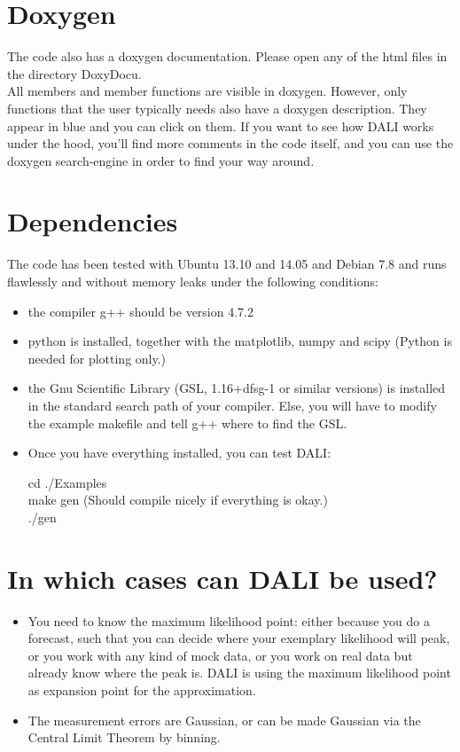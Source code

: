 \documentclass[12pt,twoside]{extarticle}
\newenvironment{exercise}{\begin{eBox}}{\hfill{\color{daliblue}}\end{eBox}}
\begin{document}
\section{Doxygen}
The code also has a doxygen documentation. Please open any of the html files in the directory DoxyDocu.\\
All members and member functions are visible in doxygen. However, only functions that the user typically needs also have a doxygen description. They appear in blue and you can click on them. If you want to see how DALI works under the hood, you'll find more comments in the code itself, and you can use the doxygen search-engine in order to find your way around.

\section{Dependencies}
The code has been tested with Ubuntu 13.10 and 14.05 and Debian 7.8 and runs flawlessly and without memory leaks under the following conditions:
\begin{itemize}
\item the compiler g++ should be version 4.7.2
\item python is installed, together with the matplotlib, numpy and scipy (Python is needed for plotting only.)
\item the Gnu Scientific Library (GSL, 1.16+dfsg-1 or similar versions) is installed in the standard search path of your compiler. Else, you will have to modify the example makefile and tell g++ where to find the GSL.
\item Once you have everything installed, you can test DALI:
\begin{exercise}
 cd ./Examples \\
 make gen  \textcolor{daliblue!70}{\hspace{0.7cm}(Should compile nicely if everything is okay.)}\\
 ./gen \\
\end{exercise}

\end{itemize}


\section{In which cases can DALI be used?}
\begin{itemize}
 \item You need to know the maximum likelihood point: either because you do a forecast, such that you can decide where your exemplary likelihood will peak, or you work with any kind of mock data, or you work on real data but already know where the peak is. DALI is using the maximum likelihood point as expansion point for the approximation.
\item The measurement errors are Gaussian, or can be made Gaussian via the Central Limit Theorem by binning.
\end{itemize}
\end{document}
